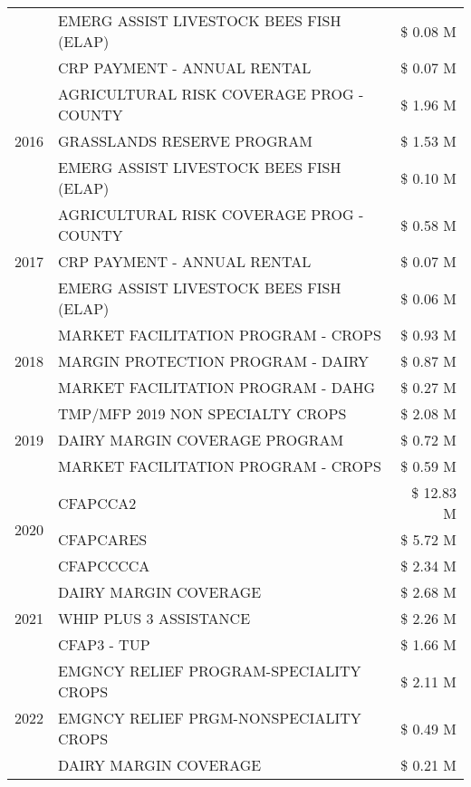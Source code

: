 \begin{tabular}{llr}
 & EMERG ASSIST LIVESTOCK BEES FISH (ELAP) & \$ 0.08 M \\
 & CRP PAYMENT - ANNUAL RENTAL & \$ 0.07 M \\
\cline{1-3}
\multirow[t]{3}{*}{2016} & AGRICULTURAL RISK COVERAGE PROG - COUNTY & \$ 1.96 M \\
 & GRASSLANDS RESERVE PROGRAM & \$ 1.53 M \\
 & EMERG ASSIST LIVESTOCK BEES FISH (ELAP) & \$ 0.10 M \\
\cline{1-3}
\multirow[t]{3}{*}{2017} & AGRICULTURAL RISK COVERAGE PROG - COUNTY & \$ 0.58 M \\
 & CRP PAYMENT - ANNUAL RENTAL & \$ 0.07 M \\
 & EMERG ASSIST LIVESTOCK BEES FISH (ELAP) & \$ 0.06 M \\
\cline{1-3}
\multirow[t]{3}{*}{2018} & MARKET FACILITATION PROGRAM - CROPS & \$ 0.93 M \\
 & MARGIN PROTECTION PROGRAM - DAIRY & \$ 0.87 M \\
 & MARKET FACILITATION PROGRAM - DAHG & \$ 0.27 M \\
\cline{1-3}
\multirow[t]{3}{*}{2019} & TMP/MFP 2019 NON SPECIALTY CROPS & \$ 2.08 M \\
 & DAIRY MARGIN COVERAGE PROGRAM & \$ 0.72 M \\
 & MARKET FACILITATION PROGRAM - CROPS & \$ 0.59 M \\
\cline{1-3}
\multirow[t]{3}{*}{2020} & CFAPCCA2 & \$ 12.83 M \\
 & CFAPCARES & \$ 5.72 M \\
 & CFAPCCCCA & \$ 2.34 M \\
\cline{1-3}
\multirow[t]{3}{*}{2021} & DAIRY MARGIN COVERAGE & \$ 2.68 M \\
 & WHIP PLUS 3 ASSISTANCE & \$ 2.26 M \\
 & CFAP3 - TUP & \$ 1.66 M \\
\cline{1-3}
\multirow[t]{3}{*}{2022} & EMGNCY RELIEF PROGRAM-SPECIALITY CROPS & \$ 2.11 M \\
 & EMGNCY RELIEF PRGM-NONSPECIALITY CROPS & \$ 0.49 M \\
 & DAIRY MARGIN COVERAGE & \$ 0.21 M \\
\cline{1-3}
\bottomrule
\end{tabular}
